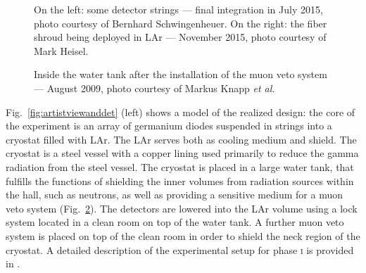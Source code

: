 \begin{figure}
	\centering
	\caption{On the left: some detector strings --- final integration in July 2015, photo courtesy of Bernhard Schwingenheuer. On the right: the fiber shroud being deployed in LAr --- November 2015, photo courtesy of Mark Heisel.}\label{fig:stringsfibers}
\end{figure}
\begin{figure}
	\centering
	\caption{Inside the water tank after the installation of the muon veto system --- August 2009, photo courtesy of Markus Knapp \emph{et al.}}\label{fig:muonveto}
\end{figure}

Fig.~\ref{fig:artistviewanddet} (left) shows a model of the realized design: the core of the experiment is an array of germanium diodes suspended in strings into a cryostat filled with LAr. The LAr serves both as cooling medium and shield. The cryostat is a steel vessel with a copper lining used primarily to reduce the gamma radiation from the steel vessel. The cryostat is placed in a large water tank, that fulfills the functions of shielding the inner volumes from radiation sources within the hall, such as neutrons, as well as providing a sensitive medium for a muon veto system (Fig.~\ref{fig:muonveto}). The detectors are lowered into the LAr volume using a lock system located in a clean room on top of the water tank. A further muon veto system is placed on top of the clean room in order to shield the neck region of the cryostat. A detailed description of the experimental setup for phase \textsc{i} is provided in \cite{gerdadescription}.

